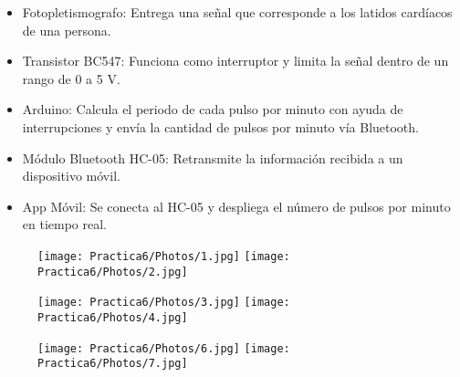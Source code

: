 \documentclass[12pt]{article}
\begin{document}
    \begin{itemize}
        \item Fotopletismografo: Entrega una señal que corresponde a los latidos cardíacos de una persona.
        \item Transistor BC547: Funciona como interruptor y limita la señal dentro de un rango de 0 a 5 V.
        \item Arduino: Calcula el periodo de cada pulso por minuto con ayuda de interrupciones y envía la cantidad de pulsos por minuto vía Bluetooth.
        \item Módulo Bluetooth HC-05: Retransmite la información recibida a un dispositivo móvil.
        \item App Móvil: Se conecta al HC-05 y despliega el número de pulsos por minuto en tiempo real.
    \end{itemize}
    \newpage
    \begin{figure}[h!]
                \centering
             \texttt{[image: Practica6/Photos/1.jpg]}
             \texttt{[image: Practica6/Photos/2.jpg]}
    \end{figure}
    \newpage
    \begin{figure}[h!]
                \centering
             \texttt{[image: Practica6/Photos/3.jpg]}
             \texttt{[image: Practica6/Photos/4.jpg]}
    \end{figure}
    \newpage
    \begin{figure}[h!]
                \centering
             \texttt{[image: Practica6/Photos/6.jpg]}
             \texttt{[image: Practica6/Photos/7.jpg]}
    \end{figure}
    
    \newpage
\end{document}
